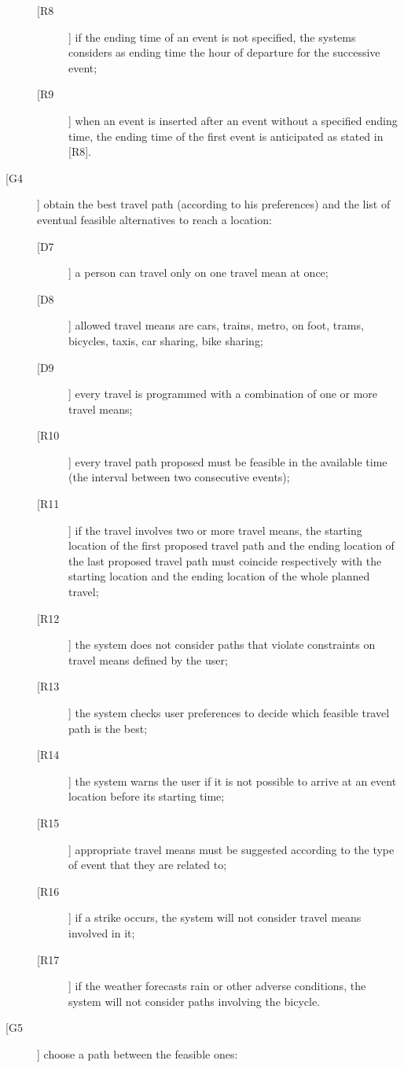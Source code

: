 \begin{description}
\begin{description}
	\item[[R8]] if the ending time of an event is not specified, the systems considers as ending time the hour of departure for the successive event;
	\item[[R9]] when an event is inserted after an event without a specified ending time, the ending time  of the first event is anticipated as stated in [R8].
	\end{description}
\item[[G4]] obtain the best travel path (according to his preferences) and the list of eventual feasible alternatives to reach a location:
	\begin{description}
	\item[[D7]] a person can travel only on one travel mean at once; 
	\item[[D8]] allowed travel means are cars, trains, metro, on foot, trams, bicycles, taxis, car sharing, bike sharing;
	\item[[D9]] every travel is programmed with a combination of one or more travel means;
	\newline
	\item[[R10]] every travel path proposed must be feasible in the available time (the interval between two consecutive events);
	\item[[R11]] if the travel involves two or more travel means, the starting location of the first proposed travel path and the ending location of the last proposed travel path must coincide respectively with the starting location and the ending location of the whole planned travel;
	\item[[R12]] the system does not consider paths that violate constraints on travel means defined by the user;
	\item[[R13]] the system checks user preferences to decide which feasible travel path is the best;
	\item[[R14]] the system warns the user if it is not possible to arrive at an event location before its starting time;
	\item[[R15]] appropriate travel means must be suggested according to the type of event that they are related to; 
	\item[[R16]] if a strike occurs, the system will not consider travel means involved in it;
	\item[[R17]] if the weather forecasts rain or other adverse conditions, the system will not consider paths involving the bicycle.
	\end{description}
\item[[G5]] choose a path between the feasible ones:

\end{description}
